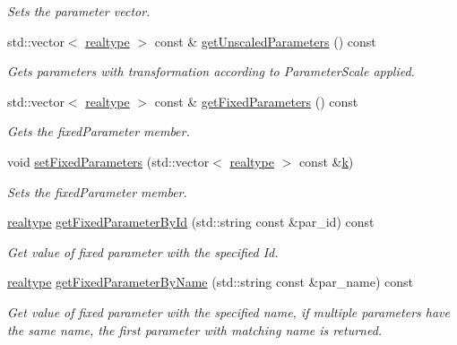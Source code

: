 \begin{DoxyCompactItemize}
\begin{DoxyCompactList}\small\item\em Sets the parameter vector. \end{DoxyCompactList}\item 
std\+::vector$<$ \mbox{\hyperlink{namespaceamici_a1bdce28051d6a53868f7ccbf5f2c14a3}{realtype}} $>$ const  \& \mbox{\hyperlink{classamici_1_1_model_a76f62d983fb3842cb695681f7ed9a9f0}{get\+Unscaled\+Parameters}} () const
\begin{DoxyCompactList}\small\item\em Gets parameters with transformation according to Parameter\+Scale applied. \end{DoxyCompactList}\item 
std\+::vector$<$ \mbox{\hyperlink{namespaceamici_a1bdce28051d6a53868f7ccbf5f2c14a3}{realtype}} $>$ const  \& \mbox{\hyperlink{classamici_1_1_model_a76b24282a74eaca67d656149310dc07c}{get\+Fixed\+Parameters}} () const
\begin{DoxyCompactList}\small\item\em Gets the fixed\+Parameter member. \end{DoxyCompactList}\item 
void \mbox{\hyperlink{classamici_1_1_model_a14ba63ae81b4e8fa1f46884b703e2c30}{set\+Fixed\+Parameters}} (std\+::vector$<$ \mbox{\hyperlink{namespaceamici_a1bdce28051d6a53868f7ccbf5f2c14a3}{realtype}} $>$ const \&\mbox{\hyperlink{classamici_1_1_model_adde50e0d8a99d20354c8403bf93fab6f}{k}})
\begin{DoxyCompactList}\small\item\em Sets the fixed\+Parameter member. \end{DoxyCompactList}\item 
\mbox{\hyperlink{namespaceamici_a1bdce28051d6a53868f7ccbf5f2c14a3}{realtype}} \mbox{\hyperlink{classamici_1_1_model_acc647ebbeaf0be737c7c165fa77eeca5}{get\+Fixed\+Parameter\+By\+Id}} (std\+::string const \&par\+\_\+id) const
\begin{DoxyCompactList}\small\item\em Get value of fixed parameter with the specified Id. \end{DoxyCompactList}\item 
\mbox{\hyperlink{namespaceamici_a1bdce28051d6a53868f7ccbf5f2c14a3}{realtype}} \mbox{\hyperlink{classamici_1_1_model_a99cc00a08b2f2d87d3eac047d00a7c57}{get\+Fixed\+Parameter\+By\+Name}} (std\+::string const \&par\+\_\+name) const
\begin{DoxyCompactList}\small\item\em Get value of fixed parameter with the specified name, if multiple parameters have the same name, the first parameter with matching name is returned. \end{DoxyCompactList}\item 

\end{DoxyCompactItemize}
